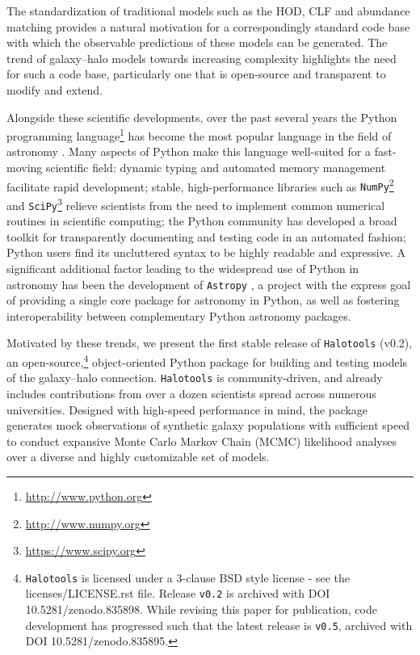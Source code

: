 \documentclass[twocolumn, tighten]{aastex6}
\begin{document}
The standardization of traditional models such as the HOD, CLF and abundance matching provides a natural motivation for a correspondingly standard code base with which the observable predictions of these models can be generated. The trend of galaxy--halo models towards increasing complexity highlights the need for such a code base, particularly one that is open-source and transparent to modify and extend.

Alongside these scientific developments, over the past several years the Python programming language\footnote{\url{http://www.python.org}} has become the most popular language in the field of astronomy \citep{momcheva_tollerud15}. Many aspects of Python make this language well-suited for a fast-moving scientific field: dynamic typing and automated memory management facilitate rapid development; stable, high-performance libraries such as {\tt NumPy}\footnote{\url{http://www.numpy.org}} \citep{numpy_array} and {\tt SciPy}\footnote{\url{https://www.scipy.org}} \citep{scipy} relieve scientists from the need to implement common numerical routines in scientific computing; the Python community has developed a broad toolkit for transparently documenting and testing code in an automated fashion; Python users find its uncluttered syntax to be highly readable and expressive. A significant additional factor leading to the widespread use of Python in astronomy has been the development of  {\tt Astropy} \citep{astropy}, a project with the express goal of providing a single core package for astronomy in Python, as well as fostering interoperability between complementary Python astronomy packages.

Motivated by these trends, we present the first stable release of {\tt Halotools} (v0.2), an open-source,\footnote{{\tt Halotools} is licensed under a 3-clause BSD style license - see the licenses/LICENSE.rst file. Release {\tt v0.2} is archived with DOI 10.5281/zenodo.835898. While revising this paper for publication, code development has progressed such that the latest release is {\tt v0.5}, archived with DOI 10.5281/zenodo.835895.} object-oriented Python package for building and testing models of the galaxy--halo connection. {\tt Halotools} is community-driven, and already includes contributions from over a dozen scientists spread across numerous universities. Designed with high-speed performance in mind, the package generates mock observations of synthetic galaxy populations with sufficient speed to conduct expansive  Monte Carlo Markov Chain (MCMC) likelihood analyses over a diverse and highly customizable set of models.
\end{document}
